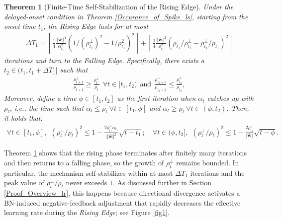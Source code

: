 \documentclass[pdflatex,sn-basic]{sn-jnl}%
\theoremstyle{thmstyleone}%
\newtheorem{theorem}{Theorem}%
\begin{document}
\begin{theorem}[Finite-Time Self-Stabilization of the Rising Edge]\label{Divergence_lr}
  Under the delayed-onset condition in Theorem \ref{Occurance_of_Spike_ls}, starting from the onset time $t_1$, the \textit{Rising Edge} lasts for at most
    \begin{equation*}
  \begin{aligned}
    \Delta T_1 = 
    \left\lceil
      \frac{1}{4}
      \frac{\Vert \hat{\mathbf{w}} \Vert^4 }{\alpha_{t_1}^2}
        \left(
          1 / (\rho_{t_1}^{\perp})^2 - 1 / \rho_{t_1}^2
        \right)^2
      \right\rceil
        +
        \left\lceil
      \frac{1}{4}
      \frac{\Vert \hat{\mathbf{w}} \Vert^2}{\rho_{t_1}^2}
      \left(
        \rho_{t_1} / \rho_{t_1}^{\perp} - \rho_{t_1}^{\perp} / \rho_{t_1}
      \right)^2
    \right\rceil
  \end{aligned}
  \end{equation*}
  iterations and turn to the \textit{Falling Edge}. 
  Specifically, there exists a $t_2 \in (t_1, t_1 + \Delta T_1]$ such that 
  \begin{equation*}
  \begin{aligned}
    \frac{\rho_{t+1}^{\perp}}{\rho_{t+1}} \ge \frac{\rho_{t}^{\perp}}{\rho_{t}} \ \ \forall t \in [t_1, t_2)
    \ \ \text{and} \ \ 
    \frac{\rho_{t_2+1}^{\perp}}{\rho_{t_2+1}} \le \frac{\rho_{t_2}^{\perp}}{\rho_{t_2}},
  \end{aligned}
  \end{equation*}
 Moreover, define a time $\phi \in [t_1, t_2]$ as the first iteration when $\alpha_t$ 
  catches up with $\rho_t$, \textit{i.e.}, the time such that 
  \( \alpha_t \le \rho_t \ \forall t \in [t_1, \phi] \) and \( \alpha_t \ge \rho_t \ \forall t \in (\phi, t_2) \). 
  Then, it holds that:
  \begin{equation*}
  \begin{aligned}
\forall t \in [t_1, \phi], \ \ 
    (\rho_{t}^{\perp}/\rho_{t})^2 
    \le 
    1 - 
    \frac{ 2 \rho_{t_1}^{\perp} \alpha_{t_1}}{\Vert \hat{\mathbf{w}} \Vert^2}
    \sqrt{t - t_1};
    \quad 
    \forall t \in (\phi, t_2], \ \ 
    (\rho_{t}^{\perp}/\rho_{t})^2 
    \le 
    1 - 
    \frac{ 2 \rho_{t_1}^{\perp}}{
      \Vert \hat{\mathbf{w}} \Vert
    }
    \sqrt{t - \phi}.
  \end{aligned}
  \end{equation*}
\end{theorem}
Theorem \ref{Divergence_lr} shows that the rising phase terminates after finitely many iterations and then returns to a falling phase, so the growth of $\rho_t^{\perp}$ remains bounded. In particular, the mechanism self-stabilizes within at most $\Delta T_1$ iterations and the peak value of $\rho_t^\perp/\rho_t$ never exceeds $1$. As discussed further in Section \ref{Proof_Overview_lr}, this happens because directional divergence activates a BN-induced negative-feedback adjustment that rapidly decreases the effective learning rate during the \textit{Rising Edge}; see Figure \ref{fig1}.
\end{document}
